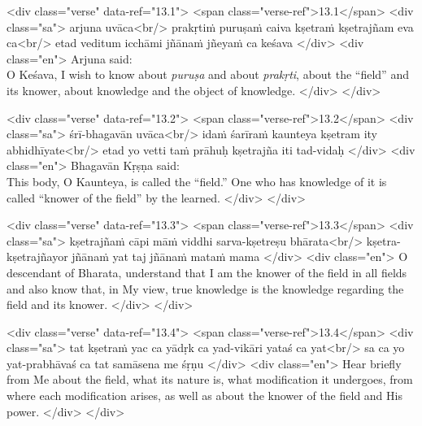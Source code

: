 \begin{html}
<div class="verse" data-ref="13.1">
  <span class="verse-ref">13.1</span>
  <div class="sa">
    arjuna uvāca<br/>
    prakṛtiṁ puruṣaṁ caiva kṣetraṁ kṣetrajñam eva ca<br/>
    etad veditum icchāmi jñānaṁ jñeyaṁ ca keśava
  </div>
  <div class="en">
    \hspace*{1em}Arjuna said: \\ O Keśava, I wish to know about \textit{puruṣa} and about \textit{prakṛti}, about the \enquote{field} and its knower, about knowledge and the object of knowledge.
  </div>
</div>
\end{html}



\begin{html}
<div class="verse" data-ref="13.2">
  <span class="verse-ref">13.2</span>
  <div class="sa">
    śrī-bhagavān uvāca<br/>
    idaṁ śarīraṁ kaunteya kṣetram ity abhidhīyate<br/>
    etad yo vetti taṁ prāhuḥ kṣetrajña iti tad-vidaḥ
  </div>
  <div class="en">
    \hspace*{1em}Bhagavān Kṛṣṇa said: \\ This body, O Kaunteya, is called the \enquote{field.} One who has knowledge of it is called \enquote{knower of the field} by the learned.
  </div>
</div>
\end{html}



\begin{html}
<div class="verse" data-ref="13.3">
  <span class="verse-ref">13.3</span>
  <div class="sa">
    kṣetrajñaṁ cāpi māṁ viddhi sarva-kṣetreṣu bhārata<br/>
    kṣetra-kṣetrajñayor jñānaṁ yat taj jñānaṁ mataṁ mama
  </div>
  <div class="en">
    O descendant of Bharata, understand that I am the knower of the field in all fields and also know that, in My view, true knowledge is the knowledge regarding the field and its knower.
  </div>
</div>
\end{html}



\begin{html}
<div class="verse" data-ref="13.4">
  <span class="verse-ref">13.4</span>
  <div class="sa">
    tat kṣetraṁ yac ca yādṛk ca yad-vikāri yataś ca yat<br/>
    sa ca yo yat-prabhāvaś ca tat samāsena me śṛṇu
  </div>
  <div class="en">
    Hear briefly from Me about the field, what its nature is, what modification it undergoes, from where each modification arises, as well as about the knower of the field and His power.
  </div>
</div>
\end{html}


